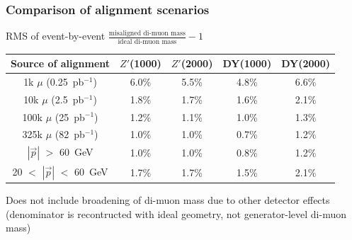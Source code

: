 \documentclass[compress]{beamer}
\begin{document}
\begin{frame}
\frametitle{Comparison of alignment scenarios}
\begin{center}
RMS of event-by-event $\displaystyle \frac{\mbox{misaligned di-muon mass}}{\mbox{ideal di-muon mass}} - 1$
\end{center}

\vfill
\renewcommand{\arraystretch}{1.2}
\begin{tabular}{c c c c c}
Source of alignment & $Z'$(1000) & $Z'$(2000) & DY(1000) & DY(2000) \\\hline
1k $\mu$ (0.25~pb$^{-1}$) & 6.0\% & 5.5\% & 4.8\% & 6.6\% \\
10k $\mu$ (2.5~pb$^{-1}$) & 1.8\% & 1.7\% & 1.6\% & 2.1\% \\
100k $\mu$ (25~pb$^{-1}$) & 1.2\% & 1.1\% & 1.0\% & 1.3\% \\
325k $\mu$ (82~pb$^{-1}$) & 1.0\% & 1.0\% & 0.7\% & 1.2\% \\\hline
$|\vec{p}|$ $>$ 60~GeV & 1.0\% & 1.0\% & 0.8\% & 1.2\% \\
20 $<$ $|\vec{p}|$ $<$ 60~GeV & 1.7\% & 1.7\% & 1.5\% & 2.1\%
\end{tabular}

\vfill\vfill\vfill Does not include broadening of di-muon mass due to other
detector effects (denominator is recontructed with ideal geometry, not
generator-level di-muon mass)
\end{frame}
\end{document}

